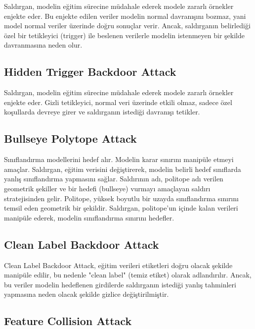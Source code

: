 Saldırgan, modelin eğitim sürecine müdahale ederek modele zararlı örnekler enjekte eder. Bu enjekte edilen veriler modelin normal davranışını bozmaz, yani model normal veriler üzerinde doğru sonuçlar verir. Ancak, saldırganın belirlediği özel bir tetikleyici (trigger) ile beslenen verilerle modelin istenmeyen bir şekilde davranmasına neden olur.

\newpage

\subsection{Hidden Trigger Backdoor Attack}

Saldırgan, modelin eğitim sürecine müdahale ederek modele zararlı örnekler enjekte eder. Gizli tetikleyici, normal veri üzerinde etkili olmaz, sadece özel koşullarda devreye girer ve saldırganın istediği davranışı tetikler.

\newpage

\subsection{Bullseye Polytope Attack}

Sınıflandırma modellerini hedef alır. Modelin karar sınırını manipüle etmeyi amaçlar. Saldırgan, eğitim verisini değiştirerek, modelin belirli hedef sınıflarda yanlış sınıflandırma yapmasını sağlar. Saldırının adı, politope adı verilen geometrik şekiller ve bir hedefi (bullseye) vurmayı amaçlayan saldırı stratejisinden gelir. Politope, yüksek boyutlu bir uzayda sınıflandırma sınırını temsil eden geometrik bir şekildir. Saldırgan, politope'un içinde kalan verileri manipüle ederek, modelin sınıflandırma sınırını hedefler.

\newpage

\subsection{Clean Label Backdoor Attack}

Clean Label Backdoor Attack, eğitim verileri etiketleri doğru olacak şekilde manipüle edilir, bu nedenle "clean label" (temiz etiket) olarak adlandırılır. Ancak, bu veriler modelin hedeflenen girdilerde saldırganın istediği yanlış tahminleri yapmasına neden olacak şekilde gizlice değiştirilmiştir. 

\newpage

\subsection{Feature Collision Attack}

